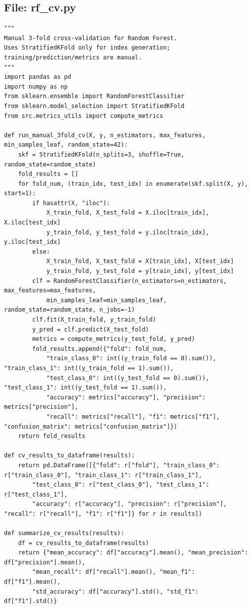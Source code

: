 \documentclass[11pt]{article}
\begin{document}
\subsection*{File: rf\_cv.py}

\begin{lstlisting}[style=pythonstyle]
"""
Manual 3-fold cross-validation for Random Forest.
Uses StratifiedKFold only for index generation; training/prediction/metrics are manual.
"""
import pandas as pd
import numpy as np
from sklearn.ensemble import RandomForestClassifier
from sklearn.model_selection import StratifiedKFold
from src.metrics_utils import compute_metrics

def run_manual_3fold_cv(X, y, n_estimators, max_features, min_samples_leaf, random_state=42):
    skf = StratifiedKFold(n_splits=3, shuffle=True, random_state=random_state)
    fold_results = []
    for fold_num, (train_idx, test_idx) in enumerate(skf.split(X, y), start=1):
        if hasattr(X, "iloc"):
            X_train_fold, X_test_fold = X.iloc[train_idx], X.iloc[test_idx]
            y_train_fold, y_test_fold = y.iloc[train_idx], y.iloc[test_idx]
        else:
            X_train_fold, X_test_fold = X[train_idx], X[test_idx]
            y_train_fold, y_test_fold = y[train_idx], y[test_idx]
        clf = RandomForestClassifier(n_estimators=n_estimators, max_features=max_features,
            min_samples_leaf=min_samples_leaf, random_state=random_state, n_jobs=-1)
        clf.fit(X_train_fold, y_train_fold)
        y_pred = clf.predict(X_test_fold)
        metrics = compute_metrics(y_test_fold, y_pred)
        fold_results.append({"fold": fold_num,
            "train_class_0": int((y_train_fold == 0).sum()), "train_class_1": int((y_train_fold == 1).sum()),
            "test_class_0": int((y_test_fold == 0).sum()), "test_class_1": int((y_test_fold == 1).sum()),
            "accuracy": metrics["accuracy"], "precision": metrics["precision"],
            "recall": metrics["recall"], "f1": metrics["f1"], "confusion_matrix": metrics["confusion_matrix"]})
    return fold_results

def cv_results_to_dataframe(results):
    return pd.DataFrame([{"fold": r["fold"], "train_class_0": r["train_class_0"], "train_class_1": r["train_class_1"],
        "test_class_0": r["test_class_0"], "test_class_1": r["test_class_1"],
        "accuracy": r["accuracy"], "precision": r["precision"], "recall": r["recall"], "f1": r["f1"]} for r in results])

def summarize_cv_results(results):
    df = cv_results_to_dataframe(results)
    return {"mean_accuracy": df["accuracy"].mean(), "mean_precision": df["precision"].mean(),
        "mean_recall": df["recall"].mean(), "mean_f1": df["f1"].mean(),
        "std_accuracy": df["accuracy"].std(), "std_f1": df["f1"].std()}
\end{lstlisting}
\end{document}
